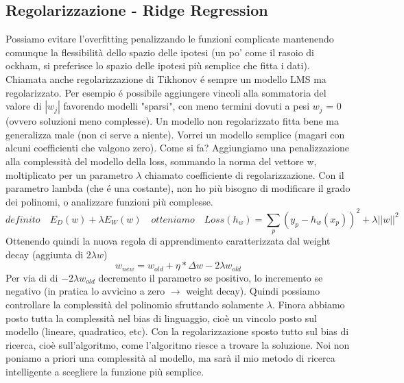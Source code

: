 \documentclass{article}
\begin{document}
\subsection{Regolarizzazione - Ridge Regression}
Possiamo evitare l'overfitting penalizzando le funzioni complicate mantenendo comunque la flessibilità dello spazio delle ipotesi (un po' come il rasoio di ockham, si preferisce lo spazio delle ipotesi più semplice che fitta i dati). \newline
Chiamata anche regolarizzazione di Tikhonov é sempre un modello LMS ma regolarizzato. Per esempio é possibile aggiungere vincoli alla sommatoria del valore di $|w_j|$ favorendo modelli "sparsi", con meno termini dovuti a pesi $w_j$ = 0 (ovvero soluzioni meno complesse). \newline 
Un modello non regolarizzato fitta bene ma generalizza male (non ci serve a niente). Vorrei un modello semplice (magari con alcuni coefficienti che valgono zero). Come si fa? Aggiungiamo una penalizzazione alla complessità del modello della loss, sommando la norma del vettore w, moltiplicato per un parametro $\lambda$ chiamato coefficiente di regolarizzazione. Con il parametro lambda (che é una costante), non ho più bisogno di modificare il grado dei polinomi, o analizzare funzioni più complesse.
\begin{equation}
    definito \quad E_D(w)+\lambda E_W(w) \quad otteniamo \quad Loss(h_w)=\sum_{p} (y_p-h_w(x_p))^2+\lambda ||w||^2
\end{equation}
Ottenendo quindi la nuova regola di apprendimento caratterizzata dal weight decay (aggiunta di $2\lambda w$)
\begin{equation}
    w_{new}= w_{old} + \eta*\Delta w - 2 \lambda w_{old}
\end{equation}
Per via di di $-2\lambda w_{old}$ decremento il parametro se positivo, lo incremento se negativo (in pratica lo avvicino a zero $\rightarrow$ weight decay). Quindi possiamo controllare la complessità del polinomio sfruttando solamente $\lambda$.\newline
Finora abbiamo posto tutta la complessità nel bias di linguaggio, cioè un vincolo posto sul modello (lineare, quadratico, etc). Con la regolarizzazione sposto tutto sul bias di ricerca, cioè sull'algoritmo, come l'algoritmo riesce a trovare la soluzione. Noi non poniamo a priori una complessità al modello, ma sarà il mio metodo di ricerca intelligente a scegliere la funzione più semplice.
\end{document}
